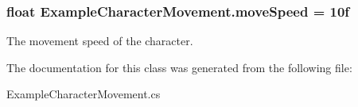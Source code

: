 \subsubsection[{move\+Speed}]{\setlength{\rightskip}{0pt plus 5cm}float Example\+Character\+Movement.\+move\+Speed = 10f}\label{class_example_character_movement_a2b35a1171dcecd39d3a8f60c5d5b037a}


The movement speed of the character. 



The documentation for this class was generated from the following file\+:\begin{DoxyCompactItemize}
\item 
Example\+Character\+Movement.\+cs\end{DoxyCompactItemize}
